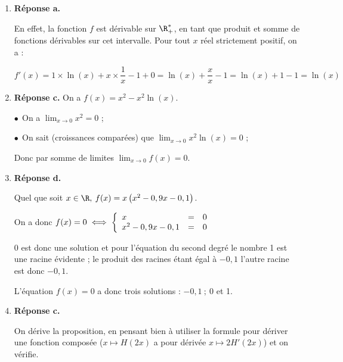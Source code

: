 \medskip

\begin{enumerate}
\item \textbf{Réponse a.}

En effet, la fonction $f$ est dérivable sur $\R_{+}^{*}$, en tant que produit et somme de fonctions dérivables sur cet intervalle. Pour tout $x$ réel strictement positif, on a :

$f'(x)= 1 \times \ln(x) + x \times \dfrac{1}{x} - 1 + 0 = \ln(x) + \dfrac{x}{x} - 1 = \ln(x) +1-1 = \ln (x)$
\item \textbf{Réponse c.}
On a $f(x) = x^2 - x^2\ln (x)$.

$\bullet~~$On a $\displaystyle\lim_{x \to 0} x^2 = 0$ ;

$\bullet~~$On sait (croissances comparées) que  $\displaystyle\lim_{x \to 0} x^2 \ln (x) = 0$ ;

Donc par somme de limites $\displaystyle\lim_{x \to 0}f(x) = 0$.





\item \textbf{Réponse d.}

Quel que soit $x \in \R,\: f(x) = x\left(x^2 - 0,9x - 0,1\right)$.

On a donc $f(x) = 0 \iff \left\{\begin{array}{l c l}
x&=&0\\
x^2 - 0,9x - 0,1&=&0
\end{array}\right.$

$0$ est donc une solution et pour l'équation du second degré le nombre 1 est une racine évidente ; le produit des racines étant égal à $-0,1$ l'autre racine est donc $- 0,1$.

L'équation $f(x) = 0$  a donc trois solutions : $-0,1 \:;\ 0$ et 1.

























			\item \textbf{Réponse c.}

			On dérive la proposition, en pensant bien à utiliser la formule pour dériver une fonction composée ($x\longmapsto H(2x)$ a pour dérivée $x \longmapsto 2H'(2x)$) et on vérifie.


\end{enumerate}
